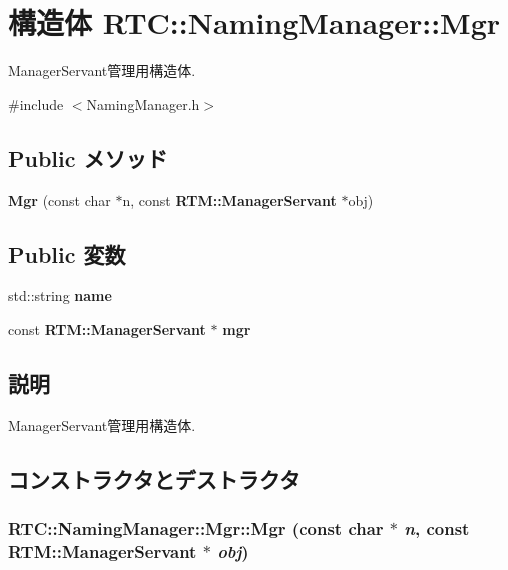 \section{構造体 RTC::NamingManager::Mgr}
\label{structRTC_1_1NamingManager_1_1Mgr}


ManagerServant管理用構造体.  




{\ttfamily \#include $<$NamingManager.h$>$}

\subsection*{Public メソッド}
\begin{DoxyCompactItemize}
\item 
{\bf Mgr} (const char $\ast$n, const {\bf RTM::ManagerServant} $\ast$obj)
\end{DoxyCompactItemize}
\subsection*{Public 変数}
\begin{DoxyCompactItemize}
\item 
std::string {\bf name}
\item 
const {\bf RTM::ManagerServant} $\ast$ {\bf mgr}
\end{DoxyCompactItemize}


\subsection{説明}
ManagerServant管理用構造体. 

\subsection{コンストラクタとデストラクタ}
\subsubsection[{Mgr}]{\setlength{\rightskip}{0pt plus 5cm}RTC::NamingManager::Mgr::Mgr (const char $\ast$ {\em n}, \/  const {\bf RTM::ManagerServant} $\ast$ {\em obj})\hspace{0.3cm}{\ttfamily  [inline]}}\label{structRTC_1_1NamingManager_1_1Mgr_ade49dca7d1070f525e0d6b6db8967a60}



